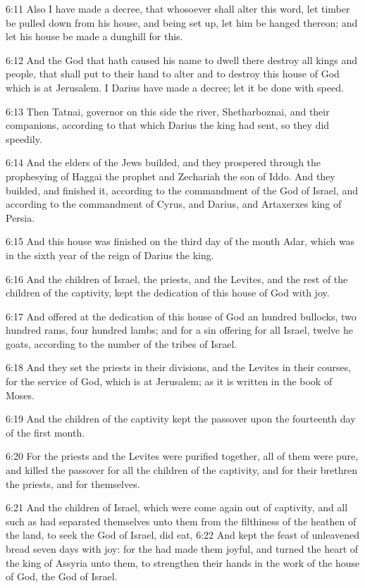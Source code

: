 6:11 Also I have made a decree, that whosoever shall alter this word,
let timber be pulled down from his house, and being set up, let him be
hanged thereon; and let his house be made a dunghill for this.

6:12 And the God that hath caused his name to dwell there destroy all
kings and people, that shall put to their hand to alter and to destroy
this house of God which is at Jerusalem. I Darius have made a decree;
let it be done with speed.

6:13 Then Tatnai, governor on this side the river, Shetharboznai, and
their companions, according to that which Darius the king had sent, so
they did speedily.

6:14 And the elders of the Jews builded, and they prospered through
the prophesying of Haggai the prophet and Zechariah the son of Iddo.
And they builded, and finished it, according to the commandment of the
God of Israel, and according to the commandment of Cyrus, and Darius,
and Artaxerxes king of Persia.

6:15 And this house was finished on the third day of the month Adar,
which was in the sixth year of the reign of Darius the king.

6:16 And the children of Israel, the priests, and the Levites, and the
rest of the children of the captivity, kept the dedication of this
house of God with joy.

6:17 And offered at the dedication of this house of God an hundred
bullocks, two hundred rams, four hundred lambs; and for a sin offering
for all Israel, twelve he goats, according to the number of the tribes
of Israel.

6:18 And they set the priests in their divisions, and the Levites in
their courses, for the service of God, which is at Jerusalem; as it is
written in the book of Moses.

6:19 And the children of the captivity kept the passover upon the
fourteenth day of the first month.

6:20 For the priests and the Levites were purified together, all of
them were pure, and killed the passover for all the children of the
captivity, and for their brethren the priests, and for themselves.

6:21 And the children of Israel, which were come again out of
captivity, and all such as had separated themselves unto them from the
filthiness of the heathen of the land, to seek the \LORD God of Israel,
did eat, 6:22 And kept the feast of unleavened bread seven days with
joy: for the \LORD had made them joyful, and turned the heart of the
king of Assyria unto them, to strengthen their hands in the work of
the house of God, the God of Israel.

